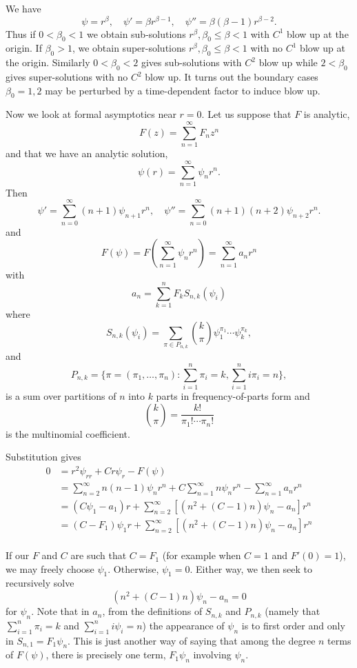 \documentclass{amsart}
\begin{document}
We have
\[
\psi = r^{\beta}, \quad \psi' = \beta r^{\beta-1}, \quad \psi'' = \beta(\beta-1) r^{\beta - 2}.
\]
Thus if \(0 < \beta_0 < 1\) we obtain sub-solutions \(r^{\beta}, \beta_0 \leq \beta < 1\) with \(C^1\) blow up at the origin. If \(\beta_0 > 1\), we obtain super-solutions \(r^{\beta}, \beta_0 \leq \beta < 1\) with no \(C^1\) blow up at the origin. Similarly \(0 < \beta_0 < 2\) gives sub-solutions with \(C^2\) blow up while \(2 < \beta_0\) gives super-solutions with no \(C^2\) blow up. It turns out the boundary cases \(\beta_0 = 1, 2\) may be perturbed by a time-dependent factor to induce blow up.

Now we look at formal asymptotics near \(r = 0\). Let us suppose that \(F\) is analytic,
\[
F(z) = \sum_{n=1}^{\infty} F_n z^n
\]
and that we have an analytic solution,
\[
\psi(r) = \sum_{n=1}^{\infty} \psi_n r^n.
\]
Then
\[
\psi' = \sum_{n=0}^{\infty} (n+1) \psi_{n+1} r^n, \quad \psi'' = \sum_{n=0}^{\infty} (n+1)(n+2) \psi_{n+2} r^n.
\]
and
\[
F(\psi) = F(\sum_{n=1}^{\infty} \psi_n r^n) = \sum_{n=1}^{\infty} a_n r^n
\]
with
\[
a_n = \sum_{k=1}^n F_k S_{n,k}(\psi_i)
\]
where
\[
S_{n,k}(\psi_i) = \sum_{\pi \in P_{n,k}} {k \choose \pi} \psi_1^{\pi_1} \cdots \psi_k^{\pi_k},
\]
and
\[
P_{n,k} = \{\pi = (\pi_1, \dots, \pi_n) : \sum_{i=1}^n \pi_i = k, \sum_{i=1}^n i \pi_i = n\},
\]
is a sum over partitions of \(n\) into \(k\) parts in frequency-of-parts form and
\[
{k \choose \pi} = \frac{k!}{\pi_1! \cdots \pi_n!}
\]
is the multinomial coefficient.

Substitution gives
\[
\begin{split}
0&= r^2 \psi_{rr} + Cr\psi_r - F(\psi) \\
&= \sum_{n=2}^{\infty} n(n-1) \psi_n r^n + C \sum_{n=1}^{\infty} n \psi_n r^n - \sum_{n=1}^{\infty} a_n r^n \\
&= (C \psi_1 - a_1) r + \sum_{n=2}^{\infty} \left[(n^2 + (C-1)n)\psi_n - a_n\right] r^n \\
&= (C - F_1) \psi_1 r + \sum_{n=2}^{\infty} \left[(n^2 +(C-1)n)\psi_n - a_n\right] r^n \\
\end{split}
\]

If our \(F\) and \(C\) are such that \(C = F_1\) (for example when \(C = 1\) and \(F'(0) = 1\)), we may freely choose \(\psi_1\). Otherwise, \(\psi_1 = 0\). Either way, we then seek to recursively solve
\[
(n^2 + (C-1)n)\psi_n - a_n = 0
\]
for \(\psi_n\). Note that in \(a_n\), from the definitions of \(S_{n,k}\) and \(P_{n,k}\) (namely that \(\sum_{i=1}^n \pi_i = k\) and \(\sum_{i=1}^n i \psi_i = n\)) the appearance of \(\psi_n\) is to first order and only in \(S_{n,1} = F_1 \psi_n\). This is just another way of saying that among the degree \(n\) terms of \(F(\psi)\), there is precisely one term, \(F_1 \psi_n\) involving \(\psi_n\).
\end{document}
